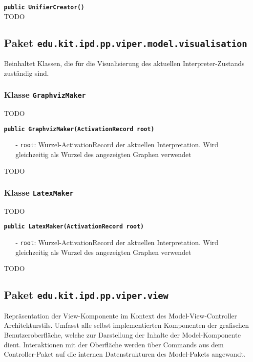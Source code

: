 \documentclass[parskip=full,11pt,twoside]{scrartcl}
\begin{document}
\textbf{\texttt{public UnifierCreator()}}\\
TODO

\newpage
\subsection{Paket \texttt{edu.kit.ipd.pp.viper.model.visualisation}}

Beinhaltet Klassen, die für die Visualisierung des aktuellen Interpreter-Zustands zuständig sind.

\subsubsection{Klasse \texttt{GraphvizMaker}}

TODO

\textbf{\texttt{public GraphvizMaker(ActivationRecord root)}}
\begin{itemize}[noitemsep]
	\item[-] \texttt{root}: Wurzel-ActivationRecord der aktuellen Interpretation. Wird gleichzeitig als Wurzel des angezeigten Graphen verwendet
\end{itemize}
TODO

\subsubsection{Klasse \texttt{LatexMaker}}
TODO

\textbf{\texttt{public LatexMaker(ActivationRecord root)}}
\begin{itemize}[noitemsep]
	\item[-] \texttt{root}: Wurzel-ActivationRecord der aktuellen Interpretation. Wird gleichzeitig als Wurzel des angezeigten Graphen verwendet
\end{itemize}
TODO

\subsection{Paket \texttt{edu.kit.ipd.pp.viper.view}}

Repräsentation der View-Komponente im Kontext des Model-View-Controller Architekturstils. Umfasst alle selbst implementierten Komponenten der grafischen Benutzeroberfläche, welche zur Darstellung der Inhalte der Model-Komponente dient. Interaktionen mit der Oberfläche werden über Commands aus dem Controller-Paket auf die internen Datenstrukturen des Model-Pakets angewandt.
\end{document}
